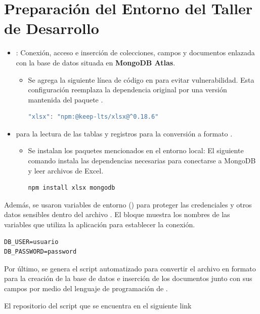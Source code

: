 \section{Preparación del Entorno del Taller de Desarrollo}
\begin{itemize}
    \item {}: Conexión, acceso e inserción de colecciones, campos y documentos enlazada con la base de datos situada en \textbf{MongoDB Atlas}.
    \begin{itemize}
        \item Se agrega la siguiente línea de código en  para evitar vulnerabilidad.
        Esta configuración reemplaza la dependencia original por una versión mantenida del paquete .
        \begin{lstlisting}[language={JavaScript}]
"xlsx": "npm:@keep-lts/xlsx@^0.18.6"
        \end{lstlisting}    
    \end{itemize}
    \item {} para la lectura de las tablas y registros para la conversión a formato .
    \begin{itemize}
    \item Se instalan los paquetes mencionados en el entorno local:
        El siguiente comando instala las dependencias necesarias para conectarse a MongoDB y leer archivos de Excel.
        \begin{lstlisting}
npm install xlsx mongodb
        \end{lstlisting} 
    \end{itemize}
\end{itemize}

Además, se usaron variables de entorno () para proteger las credenciales y otros datos sensibles dentro del archivo .
El bloque muestra los nombres de las variables que utiliza la aplicación para establecer la conexión.
\begin{lstlisting}
DB_USER=usuario
DB_PASSWORD=password
\end{lstlisting}

Por último, se genera el script automatizado para convertir el archivo \href{https://github.com/jdcast072/template_technical-report_sena/blob/6fa21db535fab5efcd2e3cbc768ae994037af95f/others/Datafile.xlsx}{} en formato  para la creación de la base de datos e inserción de los documentos junto con sus campos por medio del lenguaje de programación de .

El repositorio del script que se encuentra en el siguiente link \href{https://github.com/jdcast072/template_technical-report_sena/blob/6fa21db535fab5efcd2e3cbc768ae994037af95f/others/import-excel.js}{}


